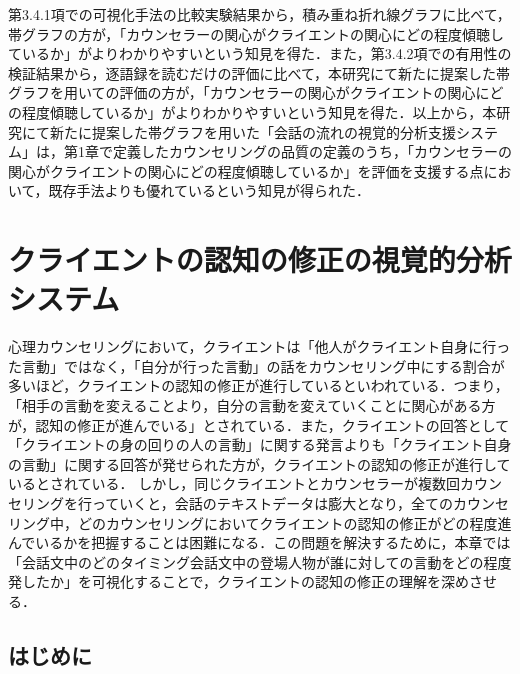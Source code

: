 \documentclass[shuuron]{kuee}
\begin{document}
第3.4.1項での可視化手法の比較実験結果から，積み重ね折れ線グラフに比べて，帯グラフの方が，「カウンセラーの関心がクライエントの関心にどの程度傾聴しているか」がよりわかりやすいという知見を得た．また，第3.4.2項での有用性の検証結果から，逐語録を読むだけの評価に比べて，本研究にて新たに提案した帯グラフを用いての評価の方が，「カウンセラーの関心がクライエントの関心にどの程度傾聴しているか」がよりわかりやすいという知見を得た．以上から，本研究にて新たに提案した帯グラフを用いた「会話の流れの視覚的分析支援システム」は，第1章で定義したカウンセリングの品質の定義のうち，「カウンセラーの関心がクライエントの関心にどの程度傾聴しているか」を評価を支援する点において，既存手法よりも優れているという知見が得られた．




\chapter{クライエントの認知の修正の視覚的分析システム}

心理カウンセリングにおいて，クライエントは「他人がクライエント自身に行った言動」ではなく，「自分が行った言動」の話をカウンセリング中にする割合が多いほど，クライエントの認知の修正が進行しているといわれている．つまり，「相手の言動を変えることより，自分の言動を変えていくことに関心がある方が，認知の修正が進んでいる」\cite{zokad}とされている．また，クライエントの回答として「クライエントの身の回りの人の言動」に関する発言よりも「クライエント自身の言動」に関する回答が発せられた方が，クライエントの認知の修正が進行しているとされている．
しかし，同じクライエントとカウンセラーが複数回カウンセリングを行っていくと，会話のテキストデータは膨大となり，全てのカウンセリング中，どのカウンセリングにおいてクライエントの認知の修正がどの程度進んでいるかを把握することは困難になる．この問題を解決するために，本章では「会話文中のどのタイミング会話文中の登場人物が誰に対しての言動をどの程度発したか」を可視化することで，クライエントの認知の修正の理解を深めさせる．

\section{はじめに}
\end{document}
